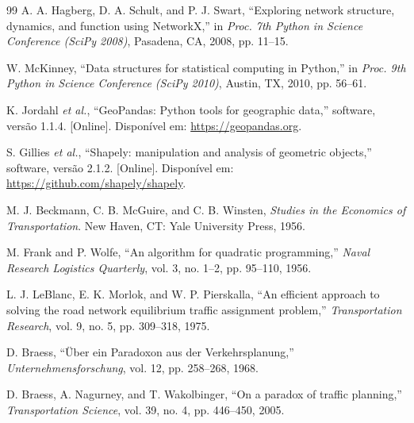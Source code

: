 \begin{thebibliography}{99}
 A. A. Hagberg, D. A. Schult, and P. J. Swart, ``Exploring network structure, dynamics, and function using NetworkX,'' in \textit{Proc. 7th Python in Science Conference (SciPy 2008)}, Pasadena, CA, 2008, pp. 11--15.

 W. McKinney, ``Data structures for statistical computing in Python,'' in \textit{Proc. 9th Python in Science Conference (SciPy 2010)}, Austin, TX, 2010, pp. 56--61.

 K. Jordahl \textit{et al.}, ``GeoPandas: Python tools for geographic data,'' software, versão 1.1.4. [Online]. Disponível em: \url{https://geopandas.org}.

 S. Gillies \textit{et al.}, ``Shapely: manipulation and analysis of geometric objects,'' software, versão 2.1.2. [Online]. Disponível em: \url{https://github.com/shapely/shapely}.

 M. J. Beckmann, C. B. McGuire, and C. B. Winsten, \textit{Studies in the Economics of Transportation}. New Haven, CT: Yale University Press, 1956.

 M. Frank and P. Wolfe, ``An algorithm for quadratic programming,'' \textit{Naval Research Logistics Quarterly}, vol. 3, no. 1--2, pp. 95--110, 1956.

 L. J. LeBlanc, E. K. Morlok, and W. P. Pierskalla, ``An efficient approach to solving the road network equilibrium traffic assignment problem,'' \textit{Transportation Research}, vol. 9, no. 5, pp. 309--318, 1975.

 D. Braess, ``Über ein Paradoxon aus der Verkehrsplanung,'' \textit{Unternehmensforschung}, vol. 12, pp. 258--268, 1968.

 D. Braess, A. Nagurney, and T. Wakolbinger, ``On a paradox of traffic planning,'' \textit{Transportation Science}, vol. 39, no. 4, pp. 446--450, 2005.

\end{thebibliography}

